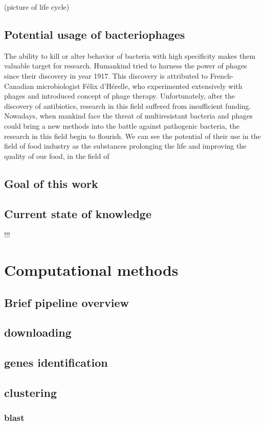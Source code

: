 \medskip
(picture of life cycle)
\medskip

\section{Potential usage of bacteriophages}
The ability to kill or alter behavior of bacteria with high specificity makes them valuable target for research.
Humankind tried to harness the power of phages since their discovery in year 1917.
This discovery is attributed to French-Canadian microbiologist Félix d'Hérelle, who experimented extensively with phages and introduced concept of phage therapy.
Unfortunately, after the discovery of antibiotics, research in this field suffered from insufficient funding.
Nowadays, when mankind face the threat of multiresistant bacteria and phages could bring a new methods into the battle against pathogenic bacteria, the research in this field begin to flourish.
We can see the potential of their use in the field of food industry as the substances prolonging the life and improving the quality of our food,
in the field of 

\section{Goal of this work}
\section{Current state of knowledge} !!!


\chapter{Computational methods}
\section{Brief pipeline overview}
\section{downloading}
\section{genes identification}
\section{clustering}
\subsection{blast}

